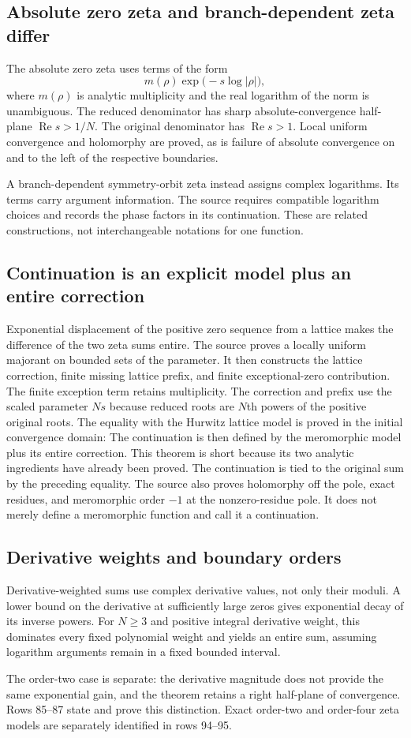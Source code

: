 \subsection{Absolute zero zeta and branch-dependent zeta differ}
The absolute zero zeta uses terms of the form
\[
 m(\rho)\exp\bigl(-s\log |\rho|\bigr),
\]
where $m(\rho)$ is analytic multiplicity and the real logarithm of the norm is unambiguous. The reduced denominator has sharp absolute-convergence half-plane $\operatorname{Re}s>1/N$. The original denominator has $\operatorname{Re}s>1$. Local uniform convergence and holomorphy are proved, as is failure of absolute convergence on and to the left of the respective boundaries.

A branch-dependent symmetry-orbit zeta instead assigns complex logarithms. Its terms carry argument information. The source requires compatible logarithm choices and records the phase factors in its continuation. These are related constructions, not interchangeable notations for one function.

\subsection{Continuation is an explicit model plus an entire correction}
Exponential displacement of the positive zero sequence from a lattice makes the difference of the two zeta sums entire. The source proves a locally uniform majorant on bounded sets of the parameter. It then constructs the lattice correction, finite missing lattice prefix, and finite exceptional-zero contribution.
The finite exception term retains multiplicity. The correction and prefix use the scaled parameter $Ns$ because reduced roots are $N$th powers of the positive original roots. The equality with the Hurwitz lattice model is proved in the initial convergence domain:
The continuation is then defined by the meromorphic model plus its entire correction.
This theorem is short because its two analytic ingredients have already been proved. The continuation is tied to the original sum by the preceding equality. The source also proves holomorphy off the pole, exact residues, and meromorphic order $-1$ at the nonzero-residue pole. It does not merely define a meromorphic function and call it a continuation.

\subsection{Derivative weights and boundary orders}
Derivative-weighted sums use complex derivative values, not only their moduli. A lower bound on the derivative at sufficiently large zeros gives exponential decay of its inverse powers. For $N\geq3$ and positive integral derivative weight, this dominates every fixed polynomial weight and yields an entire sum, assuming logarithm arguments remain in a fixed bounded interval.

The order-two case is separate: the derivative magnitude does not provide the same exponential gain, and the theorem retains a right half-plane of convergence. Rows 85--87 state and prove this distinction. Exact order-two and order-four zeta models are separately identified in rows 94--95.
